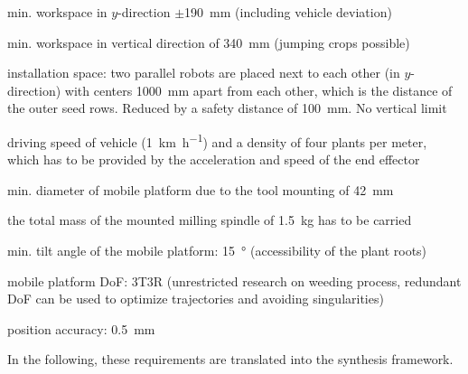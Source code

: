 \documentclass[runningheads,hidelinks]{llncs}
\begin{document}
\begin{compactitem}
    \item min. workspace in $y$-direction $\pm$\SI{190}{\mm} (including vehicle deviation)%
    \item min. workspace in vertical direction of \SI{340}{\mm} (jumping crops possible)%
    \item installation space: two parallel robots are placed next to each other (in $y$-direction) with centers \SI{1000}{\milli\metre} apart from each other, which is the distance of the outer seed rows. Reduced by a safety distance of \SI{100}{\milli\metre}. No vertical limit
    \item driving speed of vehicle (\SI{1}{\km\per\hour}) and a density of four plants per meter, which has to be provided by the acceleration and speed of the end effector%
    \item min. diameter of mobile platform due to the tool mounting of \SI{42}{\mm}
    \item the total mass of the mounted milling spindle of \SI{1.5}{\kg} has to be carried
    \item min. tilt angle of the mobile platform: \SI{15}{\degree} (accessibility of the plant roots) 
    \item mobile platform DoF: 3T3R (unrestricted research on weeding process, redundant DoF can be used to optimize trajectories and avoiding singularities)
    \item position accuracy: \SI{0.5}{\mm}
\end{compactitem}
\vspace{1mm}
In the following, these requirements are translated into the synthesis framework. 
\end{document}
